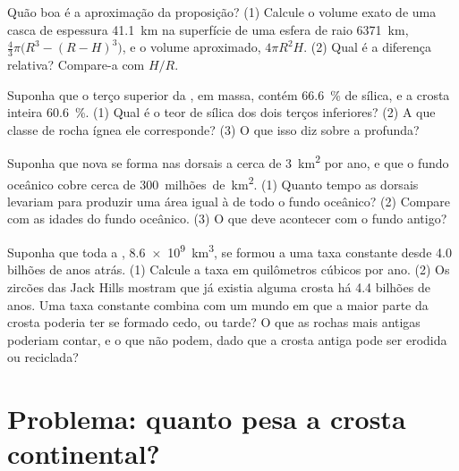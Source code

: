 \begin{exercise}[$\star\star\star$]\label{exo:g12:continental-crust:12}
Quão boa é a aproximação da proposição? (1) Calcule o volume exato de uma
casca de espessura \qty{41.1}{km} na superfície de uma esfera de raio
\qty{6371}{km}, $\tfrac{4}{3}\pi\bigl(R^3 - (R - H)^3\bigr)$, e o volume
aproximado, $4\pi R^2 H$. (2) Qual é a diferença relativa? Compare-a com
$H/R$.
\end{exercise}

\begin{exercise}[$\star\star\star$]\label{exo:g12:continental-crust:13}
Suponha que o terço superior da , em massa, contém
\qty{66.6}{\percent} de sílica, e a crosta inteira \qty{60.6}{\percent}. (1)
Qual é o teor de sílica dos dois terços inferiores? (2) A que classe de
rocha ígnea ele corresponde? (3) O que isso diz sobre a 
profunda?
\end{exercise}

\begin{exercise}[$\star\star\star$]\label{exo:g12:continental-crust:14}
Suponha que nova  se forma nas dorsais a cerca de
\qty{3}{km^2} por ano, e que o fundo oceânico cobre cerca de
\num{300}~milhões~de~\unit{km^2}. (1) Quanto tempo as dorsais levariam para
produzir uma área igual à de todo o fundo oceânico? (2) Compare com as
idades do fundo oceânico. (3) O que deve acontecer com o fundo antigo?
\end{exercise}

\begin{exercise}[$\star\star\star$]\label{exo:g12:continental-crust:15}
Suponha que toda a , \qty{8.6e9}{km^3}, se formou a uma
taxa constante desde 4.0 bilhões de anos atrás. (1) Calcule a taxa em
quilômetros cúbicos por ano. (2) Os zircões das Jack Hills mostram que já
existia alguma crosta há 4.4 bilhões de anos. Uma taxa constante combina
com um mundo em que a maior parte da crosta poderia ter se formado cedo, ou
tarde? O que as rochas mais antigas poderiam contar, e o que não podem,
dado que a crosta antiga pode ser erodida ou reciclada?
\end{exercise}

\section{Problema: quanto pesa a crosta continental?}

